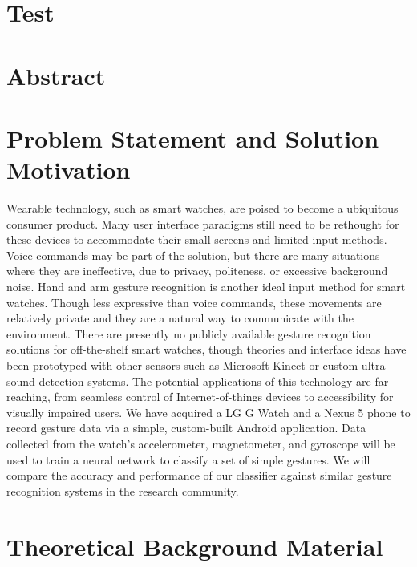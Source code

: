 \documentclass[]{article}
\author{}
\date{}
\begin{document}
\section{Test}\label{test}

\section{Abstract}

\section{Problem Statement and Solution Motivation}
Wearable technology, such as smart watches, are poised to become a ubiquitous consumer product. Many user interface paradigms still need to be rethought for these devices to accommodate their small screens and limited input methods. 
Voice commands may be part of the solution, but there are many situations where they are ineffective, due to privacy, politeness, or excessive background noise.
Hand and arm gesture recognition is another ideal input method for smart watches. Though less expressive than voice commands, these movements are relatively private and they are a natural way to communicate with the environment.
There are presently no publicly available gesture recognition solutions for off-the-shelf smart watches, though theories and interface ideas have been prototyped with other sensors such as Microsoft Kinect or custom ultra-sound detection systems.
The potential applications of this technology are far-reaching, from seamless control of Internet-of-things devices to accessibility for visually impaired users.
We have acquired a LG G Watch and a Nexus 5 phone to record gesture data via a simple, custom-built Android  application. Data collected from the watch’s accelerometer, magnetometer, and gyroscope will be used to train a neural network to classify a set of simple gestures. We will compare the accuracy and performance of our classifier against similar gesture recognition systems in the research community.

\section{Theoretical Background Material}
\end{document}

